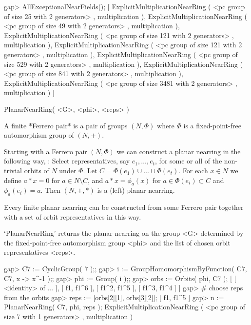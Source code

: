 \beginexample
    gap> AllExceptionalNearFields();
    [ ExplicitMultiplicationNearRing ( <pc group of size 25 with 
        2 generators> , multiplication ), 
      ExplicitMultiplicationNearRing ( <pc group of size 49 with 
        2 generators> , multiplication ), 
      ExplicitMultiplicationNearRing ( <pc group of size 121 with 
        2 generators> , multiplication ), 
      ExplicitMultiplicationNearRing ( <pc group of size 121 with 
        2 generators> , multiplication ), 
      ExplicitMultiplicationNearRing ( <pc group of size 529 with 
        2 generators> , multiplication ), 
      ExplicitMultiplicationNearRing ( <pc group of size 841 with 
        2 generators> , multiplication ), 
      ExplicitMultiplicationNearRing ( <pc group of size 3481 with 
        2 generators> , multiplication ) ]
\endexample



\>PlanarNearRing( <G>, <phi>, <reps> )

A finite *Ferrero pair* is a pair of groups $(N,\Phi)$ where $\Phi$ is a
fixed-point-free automorphism group of $(N,+)$.   

Starting with a Ferrero pair $(N,\Phi)$ we can construct a planar nearring
in the following way, \cite{Clay:Nearrings}:
Select representatives, say $e_{1},\ldots,e_{t}$, for some or all of the
non-trivial orbits of $N$ under $\Phi$. 
Let $C = \Phi(e_1)\cup\ldots\cup\Phi(e_t)$.
For each $x\in N$ we define $a * x = 0$ for $a\in N\setminus C$, and 
$a * x=\phi_{a}(x)$ for $a\in\Phi(e_{i})\subset C$ and $\phi_{a}(e_{i})=a$.
Then $(N,+,*)$ is a (left) planar nearring.

Every finite planar nearring can be constructed from some Ferrero pair 
together with a set of orbit representatives in this way.

`PlanarNearRing' returns the planar nearring on the group <G> determined by 
the fixed-point-free automorphism group <phi> and the list of chosen orbit 
representatives <reps>.

\beginexample
    gap> C7 := CyclicGroup( 7 );;
    gap> i := GroupHomomorphismByFunction( C7, C7, x -> x^-1 );;
    gap> phi := Group( i );;
    gap> orbs := Orbits( phi, C7 );
    [ [ <identity> of ... ], [ f1, f1^6 ], [ f1^2, f1^5 ], 
      [ f1^3, f1^4 ] ]
    gap> # choose reps from the orbits 
    gap> reps := [orbs[2][1], orbs[3][2]];
    [ f1, f1^5 ]
    gap> n := PlanarNearRing( C7, phi, reps );
    ExplicitMultiplicationNearRing ( <pc group of size 7 with 
    1 generators> , multiplication )
\endexample

